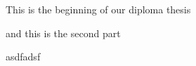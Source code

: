 \documentclass[11pt]{scrartcl}
\begin{document}
 
    This is the beginning of our diploma thesis

    and this is the second part
    
    asdfadsf
\end{document}
